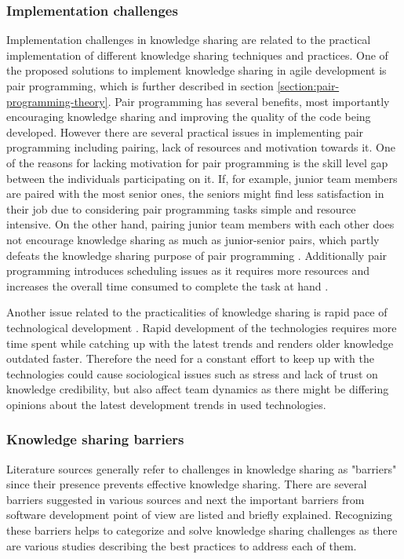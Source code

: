 \subsubsection*{Implementation challenges}

Implementation challenges in knowledge sharing are related to the practical implementation of different knowledge sharing techniques and practices. One of the proposed
solutions to implement knowledge sharing in agile development is pair programming, which is further described in section \ref{section:pair-programming-theory}.
Pair programming has several benefits, most importantly encouraging knowledge sharing and improving the quality of the code being developed. However there are several practical issues
in implementing pair programming including pairing, lack of resources and motivation towards it. One of the reasons for lacking motivation for pair
programming is the skill level gap between the individuals participating on it. If, for example, junior team members are paired with the most senior ones, the seniors might
find less satisfaction in their job due to considering pair programming tasks simple and resource intensive. \citep{Ersoy2015} On the other hand, pairing junior team
members with each other does not encourage knowledge sharing as much as junior-senior pairs, which partly defeats the knowledge sharing purpose of pair
programming \citep{Sun2009}.
Additionally pair programming introduces scheduling issues as it requires more resources and increases the overall time consumed to complete the task at hand \citep{Ersoy2015}.

Another issue related to the practicalities of knowledge sharing is rapid pace of technological development \citep{Ersoy2015}. Rapid development of the technologies requires
more time spent while catching up with the latest trends and renders older knowledge outdated faster. Therefore the need for a constant effort to keep up with the
technologies could cause sociological issues such as stress and lack of trust on knowledge credibility, but also affect team dynamics as there might be differing opinions
about the latest development trends in used technologies.

\subsubsection*{Knowledge sharing barriers}

Literature sources generally refer to challenges in knowledge sharing as "barriers" since
their presence prevents effective knowledge sharing. There are several barriers suggested
in various sources and next the important barriers from software development point of view are listed and briefly explained. Recognizing these barriers helps to categorize
and solve knowledge sharing challenges as there are various studies describing the best practices to address each of them.

